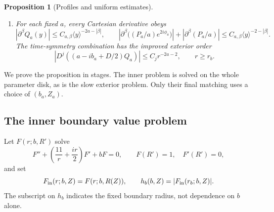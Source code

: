 \documentclass[11pt]{article}
\numberwithin{equation}{section}
\newtheorem{proposition}[theorem]{Proposition}
\theoremstyle{definition}
\theoremstyle{remark}
\begin{document}
\begin{proposition}[Profiles and uniform estimates]
\begin{enumerate}
\begin{equation}
       \le C_{N,J}r^{-2N-2},\qquad 0\le j\le J,\quad r\ge r_b.
\end{equation}
The constants are uniform as $a\downarrow0$.  In particular,
\begin{equation}\label{profile:exterior-pressure}
 |D^j(P_a/a)|\le\eta_j(a)r^{-2},\qquad
 |D^je^{2i\phi_a}|\le C_j,\qquad \eta_j(a)\longrightarrow0
\end{equation}
for each fixed $j$.  On the inner ball,
\begin{equation}\label{profile:pressure-transport}
 W_a(P_a/a)\le Ca(P_a/a),\qquad r\le r_b,
\end{equation}
whereas $|W_a(P_a/a)|\le\eta(a)r^{-2}$ for $r\ge r_b$, with
$\eta(a)\to0$.  Consequently the positive part of $W_a(P_a/a)$ is
bounded uniformly on the whole space.
\item For each fixed $a$, every Cartesian derivative obeys
\begin{equation}\label{profile:fixed-power-symbols}
 |\partial^\beta Q_a(y)|\le C_{a,\beta}\langle y\rangle^{-2a-|\beta|},
 \qquad
 \left|\partial^\beta\big((P_a/a)e^{2i\phi_a}\big)\right|
       +|\partial^\beta(P_a/a)|
       \le C_{a,\beta}\langle y\rangle^{-2-|\beta|}.
\end{equation}
The time-symmetry combination has the improved exterior order
\begin{equation}\label{profile:time-symbol}
 \left|D^j\left((a-ib_a+D/2)Q_a\right)\right|
       \le C_j r^{-2a-2},\qquad r\ge r_b.
\end{equation}
\end{enumerate}
\end{proposition}

We prove the proposition in stages.  The inner problem is solved on the
whole parameter disk, as is the slow exterior problem.  Only their final
matching uses a choice of $(b_a,Z_a)$.

\subsection{The inner boundary value problem}

Let $F(r;b,R')$ solve
\begin{equation}\label{profile:free-initial}
 F''+\left(\frac{11}{r}+\frac{ir}{2}\right)F'+bF=0,
       \qquad F(R')=1,\quad F'(R')=0,
\end{equation}
and set
\[
 F_{\rm in}(r;b,Z)=F(r;b,R(Z)),\qquad
 h_b(b,Z)=|F_{\rm in}(r_b;b,Z)|.
\]
The subscript on $h_b$ indicates the fixed boundary radius, not
dependence on $b$ alone.
\end{document}
